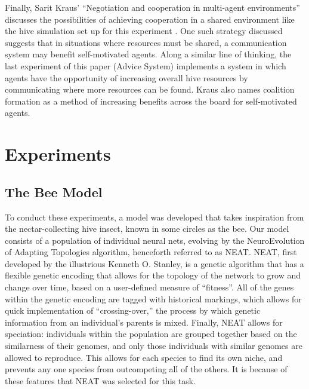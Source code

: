\documentclass[11pt]{article}
\begin{document}
		Finally, Sarit Kraus' ``Negotiation and cooperation in multi-agent environments'' discusses the possibilities of achieving cooperation in a shared environment like the hive simulation set up for this experiment \cite{kraus}. One such strategy discussed suggests that in situations where resources must be shared, a communication system may benefit self-motivated agents. Along a similar line of thinking, the last experiment of this paper (Advice System) implements a system in which agents have the opportunity of increasing overall hive resources by communicating where more resources can be found. Kraus also names coalition formation as a method of increasing benefits across the board for self-motivated agents. 



	\section{Experiments} %
	\label{sec:experiments}

		\subsection{The Bee Model} %
		\label{sub:the_bee_model}
			To conduct these experiments, a model was developed that takes inspiration from the nectar-collecting hive insect, known in some circles as the bee. Our model consists of a population of individual neural nets, evolving by the NeuroEvolution of Adapting Topologies algorithm, henceforth referred to as NEAT.\cite{neat} NEAT, first developed by the illustrious Kenneth O. Stanley, is a genetic algorithm that has a flexible genetic encoding that allows for the topology of the network to grow and change over time, based on a user-defined measure of ``fitness''. All of the genes within the genetic encoding are tagged with historical markings, which allows for quick implementation of ``crossing-over,'' the process by which genetic information from an individual's parents is mixed. Finally, NEAT allows for speciation: individuals within the population are grouped together based on the similarness of their genomes, and only those individuals with similar genomes are allowed to reproduce. This allows for each species to find its own niche, and prevents any one species from outcompeting all of the others. It is because of these features that NEAT was selected for this task.
\end{document}
